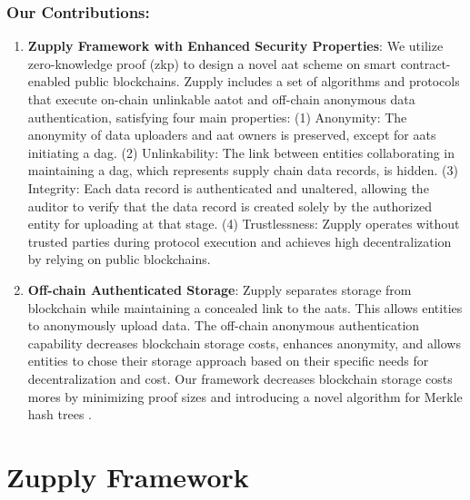 \subsubsection{Our Contributions:}
\begin{enumerate}
    \item  \textbf{Zupply Framework with Enhanced Security Properties}: We utilize zero-knowledge proof (\gls{zkp}) to design a novel \gls{aat} scheme on smart contract-enabled public blockchains. Zupply includes a set of algorithms and protocols that execute on-chain unlinkable \gls{aatot} and off-chain anonymous data authentication, satisfying four main properties: (1) Anonymity: The anonymity of data uploaders and \gls{aat} owners is preserved, except for \gls{aat}s initiating a \gls{dag}. (2) Unlinkability: The link between entities collaborating in maintaining a \gls{dag}, which represents supply chain data records, is hidden. (3) Integrity: Each data record is authenticated and unaltered, allowing the auditor to verify that the data record is created solely by the authorized entity for uploading at that stage. (4) Trustlessness: Zupply operates without trusted parties during protocol execution and achieves high decentralization by relying on public blockchains.
    
    
    \item  \textbf{Off-chain Authenticated Storage}: Zupply separates storage from blockchain while maintaining a concealed link to the \gls{aat}s. This allows entities to anonymously upload data. The off-chain anonymous authentication capability decreases blockchain storage costs, enhances anonymity, and allows entities to chose their storage approach based on their specific needs for decentralization and cost. Our framework decreases blockchain storage costs mores by minimizing proof sizes and introducing a novel algorithm for Merkle hash trees  \cite{Merkle1980}.
      

\end{enumerate}


\section{Zupply Framework}
\label{sec:Zupply Framework}

